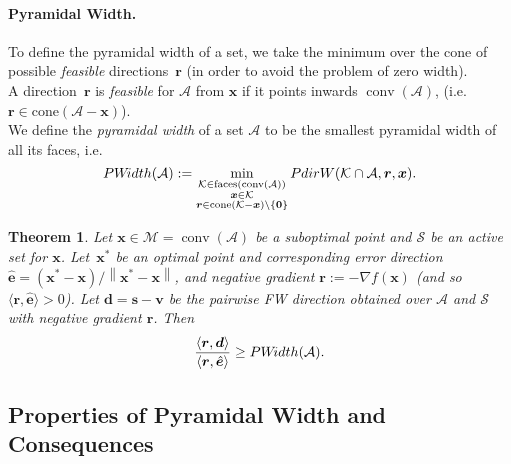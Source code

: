 \documentclass{article} %
\newtheorem{theorem}[definition]{Theorem}
\DeclareMathOperator*{\conv}{conv}
\providecommand{\norm}[1]{\left\lVert#1\right\rVert}
\newcommand{\domain}{\mathcal{M}} %
\newcommand{\x}{\bm{x}}
\newcommand{\s}{\bm{s}}
\newcommand{\dd}{\bm{d}}
\newcommand{\vv}{\bm{v}} %
\newcommand{\Vertices}{\mathcal{A}} %
\renewcommand{\S}{\mathcal{S}}
\renewcommand{\r}{\bm{r}}
\newcommand{\PdirW}{\mathop{PdirW}}
\newcommand{\PWidth}{\mathop{PW\!idth}}
\newcommand{\innerProdCompressed}[2]{\langle #1 , #2 \rangle}
\newcommand{\Kface}{\mathcal{K}}
\newcommand{\err}{\bm{e}} %
\newcommand{\0}{\mathbf{0}} %
\begin{document}
\vspace{-2mm}
\paragraph{Pyramidal Width.}
To define the pyramidal width of a set, we take the minimum over the cone of
possible \emph{feasible} directions~$\r$ (in order to avoid the problem of zero width).\\
%
A direction~$\r$ is \emph{feasible} for $\Vertices$ from $\x$ if it points inwards $\conv(\Vertices)$, 
%
(i.e. $\r \in \text{cone}(\Vertices-\x)$).\\
We define the \emph{pyramidal width} of a set $\Vertices$ to be the smallest pyramidal width of all its faces, i.e.\vspace{-0.5mm}
\begin{equation} \label{eq:Pwidth}
\PWidth(\Vertices) := \displaystyle \min_{\substack{\Kface \in \textrm{faces}(\conv(\Vertices)) \\
												  \x \in \Kface \\
												  \r \in \text{cone}(\Kface-\x) \setminus \{\0\}} 
                                   } \PdirW(\Kface \cap \Vertices,\r, \x)                   .    \vspace{-1mm}                             
\end{equation}
%

\begin{theorem} \label{thm:muFdirWinterpretation}
Let $\x \in \domain=\conv(\Vertices)$ be a suboptimal point and $\S$ be an
active set for $\x$. Let~$\x^*$ be an optimal point and corresponding error
direction $\hat{\err} = (\x^*-\x)/\norm{\x^*-\x}$, and negative gradient $\r
:= -\nabla f(\x)$  (and so $\innerProdCompressed{\r}{\hat{\err}} > 0$). Let
$\dd = \s \!- \!\vv$ be the pairwise FW direction obtained over $\Vertices$ and $\S$ with negative
gradient $\r$. Then \vspace{-2mm}
\begin{equation} \label{eq:PWidthIsBound}
\frac{\innerProdCompressed{\r}{\dd}}{\innerProdCompressed{\r}{\hat{\err}}}
\geq \PWidth(\Vertices) .\vspace{-3mm}
\end{equation}   
\end{theorem}

%
%
%
%
%
%
%
%
%
%
%
%
%
%
%


\subsection{Properties of Pyramidal Width and Consequences}\vspace{-2mm}
\end{document}
